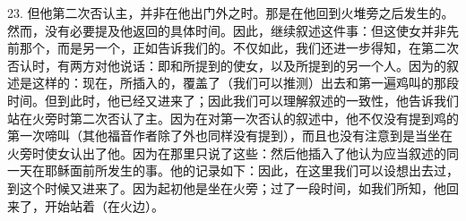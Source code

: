 23. 但他第二次否认主，并非在他出门外之时。那是在他回到火堆旁之后发生的。然而，没有必要提及他返回的具体时间。因此，继续叙述这件事：但这使女并非先前那个，而是另一个，正如告诉我们的。不仅如此，我们还进一步得知，在第二次否认时，有两方对他说话：即和所提到的使女，以及所提到的另一个人。因为的叙述是这样的：现在，所插入的，覆盖了（我们可以推测）出去和第一遍鸡叫的那段时间。但到此时，他已经又进来了；因此我们可以理解叙述的一致性，他告诉我们站在火旁时第二次否认了主。因为在对第一次否认的叙述中，他不仅没有提到鸡的第一次啼叫（其他福音作者除了外也同样没有提到），而且也没有注意到是当坐在火旁时使女认出了他。因为在那里只说了这些：然后他插入了他认为应当叙述的同一天在耶稣面前所发生的事。他的记录如下：因此，在这里我们可以设想出去过，到这个时候又进来了。因为起初他是坐在火旁；过了一段时间，如我们所知，他回来了，开始站着（在火边）。\par

